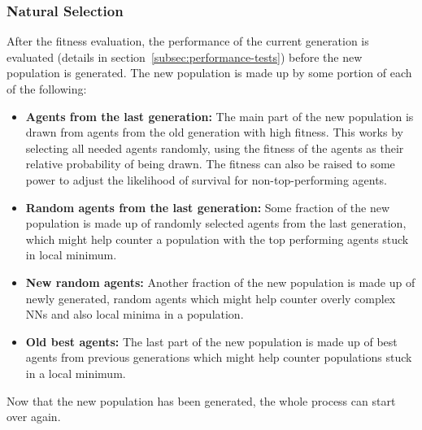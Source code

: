 \subsubsection{Natural Selection}
After the fitness evaluation, the performance of the current generation is evaluated (details in section~\ref{subsec:performance-tests}) before the new population is generated.
The new population is made up by some portion of each of the following:
\begin{itemize}
    \item \textbf{Agents from the last generation:}
    The main part of the new population is drawn from agents from the old generation with high fitness.
    This works by selecting all needed agents randomly, using the fitness of the agents as their relative probability of being drawn.
    The fitness can also be raised to some power to adjust the likelihood of survival for non-top-performing agents.
    \item \textbf{Random agents from the last generation:}
    Some fraction of the new population is made up of randomly selected agents from the last generation, which might help counter a population with the top performing agents stuck in local minimum.
    \item \textbf{New random agents:}
    Another fraction of the new population is made up of newly generated, random agents which might help counter overly complex NNs and also local minima in a population.
    \item \textbf{Old best agents:}
    The last part of the new population is made up of best agents from previous generations which might help counter populations stuck in a local minimum.
\end{itemize}
Now that the new population has been generated, the whole process can start over again.

